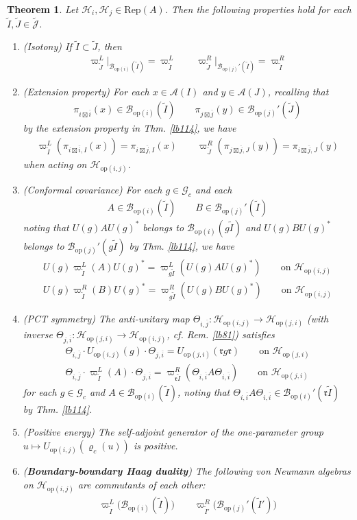 \documentclass[11pt,b5paper,notitlepage]{article}
\theoremstyle{definition}
\theoremstyle{plain}
\newtheorem{thm}[df]{Theorem}
\newcommand{\wtd}{\widetilde}
\newcommand{\ovl}{\overline}
\newcommand{\op}{\mathrm{op}}
\newcommand{\Rep}{\mathrm{Rep}}
\newcommand{\Jtd}{\widetilde{\mathcal J}}
\newcommand{\Gc}{\mathscr G_c}
\newcommand{\rk}{\mathfrak r}
\newcommand{\MA}{\mathcal A}
\newcommand{\MH}{\mathcal H}
\newcommand{\Bopi}{\mathcal B_{\mathrm{op}(i)}}
\newcommand{\Bopj}{\mathcal B_{\mathrm{op}(j)}}
\newcommand{\Hopij}{\mathcal H_{\mathrm{op}(i,j)}}
\newcommand{\Hopji}{\mathcal H_{\mathrm{op}(j,i)}}
\numberwithin{equation}{section}
\begin{document}
\begin{thm}\label{lb119}
Let $\MH_i,\MH_j\in\Rep(A)$. Then the following properties hold for each $\wtd I,\wtd J\in\Jtd$.
\begin{enumerate}[label=(\arabic*)]
\item (Isotony) If $\wtd I\subset\wtd J$, then
\begin{gather*}
\varpi^L_{\wtd J}\big|_{\Bopi(\wtd I)}=\varpi^L_{\wtd I}\qquad \varpi^R_{\wtd J}\big|_{\Bopj'(\wtd I)}=\varpi^R_{\wtd I}
\end{gather*}
\item (Extension property) For each $x\in\MA(I)$ and $y\in\MA(J)$, recalling that
\begin{gather*}
\pi_{i\boxtimes\ovl i}(x)\in\Bopi(\wtd I)\qquad \pi_{j\boxtimes\ovl j}(y)\in\Bopj'(\wtd J)
\end{gather*}
by the extension property in Thm. \ref{lb114}, we have
\begin{gather*}
\varpi^L_{\wtd I}(\pi_{i\boxtimes\ovl i,I}(x))=\pi_{i\boxtimes\ovl j,I}(x)\qquad \varpi^R_{\wtd J}(\pi_{j\boxtimes\ovl j,J}(y))=\pi_{i\boxtimes\ovl j,J}(y)
\end{gather*}
when acting on $\Hopij$.
\item (Conformal covariance) For each $g\in\Gc$ and each
\begin{align*}
A\in\Bopi(\wtd I)\qquad B\in\Bopj'(\wtd I)
\end{align*}
noting that $U(g)AU(g)^*$ belongs to $\Bopi(g\wtd I)$ and $U(g)BU(g)^*$ belongs to $\Bopj'(g\wtd I)$ by Thm. \ref{lb114}, we have
\begin{gather*}
U(g)\varpi^L_{\wtd I}(A)U(g)^*=\varpi^L_{g\wtd I}(U(g)AU(g)^*)\qquad\text{on }\Hopij\\ 
U(g)\varpi^R_{\wtd I}(B)U(g)^*=\varpi^R_{g\wtd I}(U(g)BU(g)^*)\qquad\text{on }\Hopij
\end{gather*}
\item (PCT symmetry) The anti-unitary map $\Theta_{i,\ovl j}:\Hopij\rightarrow\Hopji$ (with inverse $\Theta_{j,\ovl i}:\Hopji\rightarrow\Hopij$, cf. Rem. \ref{lb81}) satisfies
\begin{gather*}
\Theta_{i,\ovl j}\cdot U_{\op(i,j)}(g)\cdot\Theta_{j,\ovl i}=U_{\op(j,i)}(\rk g\rk)\qquad\text{on }\Hopji \\
\Theta_{i,\ovl j}\cdot\varpi^L_{\wtd I}(A)\cdot\Theta_{j,\ovl i}=\varpi^R_{\rk\wtd I}(\Theta_{i,\ovl i}A\Theta_{i,\ovl i})\qquad\text{on }\Hopji
\end{gather*}
for each $g\in\Gc$ and $A\in\Bopi(\wtd I)$, noting that $\Theta_{i,\ovl i}A\Theta_{i,\ovl i}\in\Bopi'(\rk\wtd I)$ by Thm. \ref{lb114}.
\item (Positive energy) The self-adjoint generator of the one-parameter group $u\mapsto U_{\op(i,j)}(\varrho_c(u))$ is positive.
\item(\textbf{Boundary-boundary Haag duality}) The following von Neumann algebras on $\Hopij$ are commutants of each other:
\begin{align}\label{eq51}
\varpi^L_{\wtd I}\big(\Bopi(\wtd I)\big)\qquad\varpi^R_{\wtd I'}\big(\Bopj'(\wtd I')\big)
\end{align}
\end{enumerate}
\end{thm}
\end{document}
